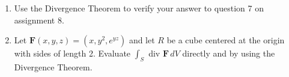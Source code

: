 \documentclass{article}
\begin{document}
\begin{enumerate}
\begin{enumerate}
        \begin{proof}
            \begin{align*}
                \iiint_R \nabla f \cdot \nabla g \, dV = \iint_{\partial R} f \nabla  g \cdot \boldsymbol n \, dS - \iiint_R f \nabla^2 g \, dV \\
               \iff \iiint_R \nabla f \cdot \nabla g \, dV + \iiint_R f \nabla^2 g \, dV = \iint_{\partial R} f \nabla  g \cdot \boldsymbol n \, dS \\
            \end{align*}
            \begin{align*}
                \iint_{\partial R} f \nabla  g \cdot \boldsymbol n \, dS \overset{\text{Div Thm}}{=} \iiint_R \text{div} (f \nabla g) \, dV  \overset{\text{(ii)}}{=} \iiint_R f(\text{div} \nabla g) + \nabla g \cdot \nabla f \, dV  \\
                = \iiint_R f(\text{div} \nabla g) \, dV + \iiint_R \nabla f \cdot \nabla g \, dV = \iiint_R f \nabla^2 g \, dV + \iiint_R \nabla f \cdot \nabla g \, dV \\
            \end{align*}
        \end{proof}
    \end{enumerate} 
    \newpage
    \item Use the Divergence Theorem to verify your answer to question 7 on assignment 8.
    \newpage
    \item Let $\boldsymbol F (x,y,z) = (x,y^2,e^{yz})$ and let $R$ be a cube centered at the origin with sides of length 2. Evaluate $\displaystyle \int_S$ div $\boldsymbol F \, dV $ directly and by using the Divergence Theorem. 


\end{enumerate}
\end{document}
